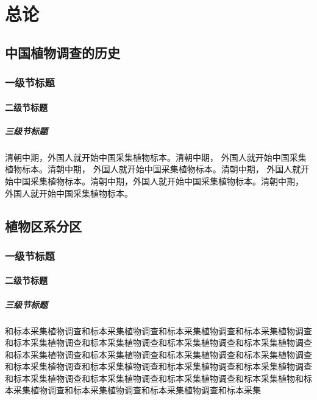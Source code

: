 \documentclass[utf8]{book}
\begin{document}
\mainmatter

\part{总论}

\chapter{中国植物调查的历史}

\section{一级节标题}

\subsection{二级节标题}

\subsubsection{三级节标题}

\begin{multicols}{2}

清朝中期，外国人就开始中国采集植物标本。清朝中期， 外国人就开始中国采集植物标本。清朝中期， 外国人就开始中国采集植物标本。清朝中期， 外国人就开始中国采集植物标本。清朝中期，外国人就开始中国采集植物标本。清朝中期， 外国人就开始中国采集植物标本。

\end{multicols}

\chapter{植物区系分区}

\section{一级节标题}

\subsection{二级节标题}

\subsubsection{三级节标题}

\begin{multicols}{2}

和标本采集植物调查和标本采集植物调查和标本采集植物调查和标本采集植物调查和标本采集植物调查和标本采集植物调查和标本采集植物调查和标本采集植物调查和标本采集植物调查和标本采集植物调查和标本采集植物调查和标本采集植物调查和标本采集植物调查和标本采集植物调查和标本采集植物调查和标本采集植物调查和标本采集植物调查和标本采集植物调查和标本采集植物调查和标本采集植物和标本采集植物调查和标本采集植物调查和标本采集植物调查和标本采集

\end{multicols}
\end{document}

